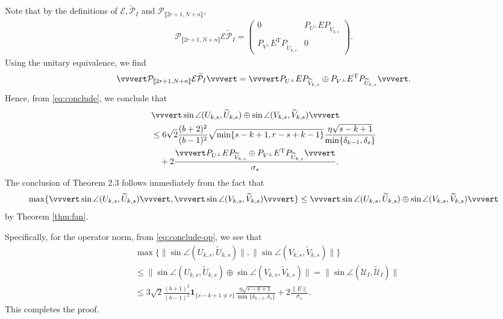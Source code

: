 \documentclass[reqno]{amsart}
\newcommand{\T}{\mathrm{T}}
\theoremstyle{plain}
\theoremstyle{definition}
\begin{document}
Note that by the definitions of $\mathcal E, \widetilde{\mathcal P}_I$ and $\mathcal P_{\llbracket 2r+1, N+n\rrbracket}$,
\begin{align*}
\mathcal P_{\llbracket 2r+1, N+n\rrbracket} \mathcal E \widetilde{\mathcal P}_I =\begin{pmatrix}
0 & P_{U^\perp} E P_{\widetilde V_{k,s}}\\
P_{V^\perp} E^\T P_{\widetilde U_{k,s}} & 0
\end{pmatrix}.
\end{align*}
Using the unitary equivalence, we find 
$$\vvvert  \mathcal P_{\llbracket 2r+1, N+n\rrbracket} \mathcal E \widetilde{\mathcal P}_I \vvvert = \vvvert P_{U^\perp} E P_{\widetilde V_{k,s}} \oplus P_{V^\perp} E^\T P_{\widetilde U_{k,s}} \vvvert.$$
Hence, from \eqref{eq:conclude}, we conclude that
\begin{align}\label{eq:conclusionbd2}
&\vvvert \sin \angle ( U_{k,s}, \widetilde{ U}_{k,s}) \oplus \sin \angle ( V_{k,s}, \widetilde{ V}_{k,s}) \vvvert \nonumber\\
&\le 6\sqrt{2} \frac{(b+2)^2}{(b-1)^2}\sqrt{\min\{s-k+1,r-s+k-1\}} \frac{ \eta\sqrt{s-k+1}}{\min\{\delta_{k-1}, \delta_s\}} \nonumber\\
&\quad + 2 \frac{\vvvert P_{U^\perp} E P_{\widetilde V_{k,s}} \oplus P_{V^\perp} E^\T P_{\widetilde U_{k,s}} \vvvert}{{\sigma}_{s}}.
\end{align}
The conclusion of Theorem 2.3 follows immediately from the fact that
$$\max\{ \vvvert \sin \angle ( U_{k,s}, \widetilde{ U}_{k,s})\vvvert, \vvvert\sin \angle ( V_{k,s}, \widetilde{ V}_{k,s}) \vvvert  \} \le \vvvert \sin \angle ( U_{k,s}, \widetilde{ U}_{k,s}) \oplus \sin \angle ( V_{k,s}, \widetilde{ V}_{k,s}) \vvvert$$
by Theorem \ref{thm:fan}. 

Specifically, for the operator norm, from \eqref{eq:conclude-op}, we see that
\begin{align*}
&\max\{ \|\sin \angle ( U_{k,s}, \widetilde{ U}_{k,s})\|, \|\sin \angle ( V_{k,s}, \widetilde{ V}_{k,s})\| \}\\
&\le \|\sin \angle ( U_{k,s}, \widetilde{ U}_{k,s}) \oplus \sin \angle ( V_{k,s}, \widetilde{ V}_{k,s})\|=\|\sin \angle (\mathcal U_{I}, \widetilde{\mathcal U}_{I})\|\\
&\le 3\sqrt{2} \frac{(b+1)^2}{(b-1)^2} \mathbf{1}_{\{s-k+1\neq r \}}\frac{ \eta\sqrt{s-k+1}}{\min\{\delta_{k-1}, \delta_s\}} + 2\frac{\|E\|}{{\sigma}_{s}}.
\end{align*}
This completes the proof. 
\end{document}
